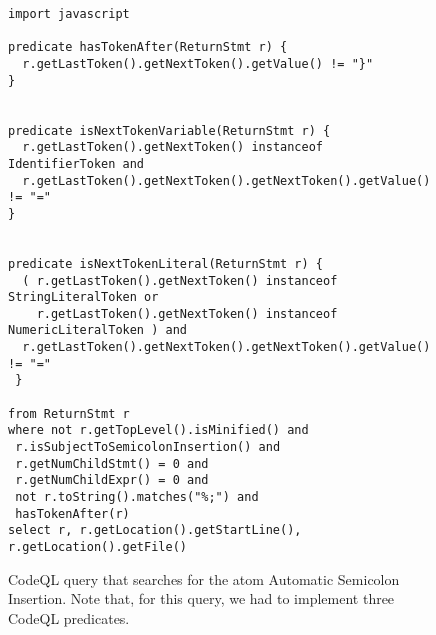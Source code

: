 \begin{figure}[htb]
\begin{lstlisting}[language=CodeQL, basicstyle=\scriptsize]
import javascript

predicate hasTokenAfter(ReturnStmt r) {
  r.getLastToken().getNextToken().getValue() != "}"
}


predicate isNextTokenVariable(ReturnStmt r) {
  r.getLastToken().getNextToken() instanceof IdentifierToken and 
  r.getLastToken().getNextToken().getNextToken().getValue() != "="
}


predicate isNextTokenLiteral(ReturnStmt r) {
  ( r.getLastToken().getNextToken() instanceof StringLiteralToken or
    r.getLastToken().getNextToken() instanceof NumericLiteralToken ) and 
  r.getLastToken().getNextToken().getNextToken().getValue() != "="
 }

from ReturnStmt r
where not r.getTopLevel().isMinified() and
 r.isSubjectToSemicolonInsertion() and 
 r.getNumChildStmt() = 0 and
 r.getNumChildExpr() = 0 and
 not r.toString().matches("%;") and
 hasTokenAfter(r) 
select r, r.getLocation().getStartLine(), r.getLocation().getFile()
\end{lstlisting}
  \caption{CodeQL query that searches for the atom Automatic Semicolon Insertion. Note that, for this query,
    we had to implement three CodeQL predicates.}
  \label{lst:codeql-automatic}
\end{figure}


